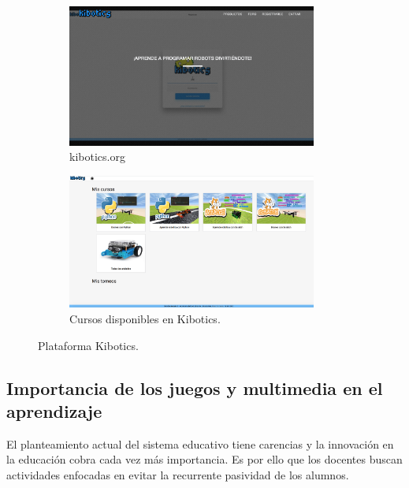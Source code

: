 \begin{figure}[H]
  \begin{subfigure}[b]{0.5\textwidth}
  \centering
    \includegraphics[width=0.9\textwidth, height=0.6\textwidth]{chapters/images/kiboticsorg.png}
    \caption{kibotics.org}
    \label{fig:f1}
  \end{subfigure}
  \hfill
  \begin{subfigure}[b]{0.5\textwidth}
  \centering
    \includegraphics[width=0.9\textwidth, height=0.6\textwidth]{chapters/images/kibotics.png}
    \caption{Cursos disponibles en Kibotics.}
    \label{fig:f2}
  \end{subfigure}
  \caption{Plataforma Kibotics.}
\end{figure}
 
\subsection{Importancia de los juegos y multimedia en el aprendizaje} 
El planteamiento actual del sistema educativo tiene carencias y la innovación en la educación cobra cada vez más importancia. Es por ello que los docentes buscan actividades enfocadas en evitar la recurrente pasividad de los alumnos\cite{multimedia}.

